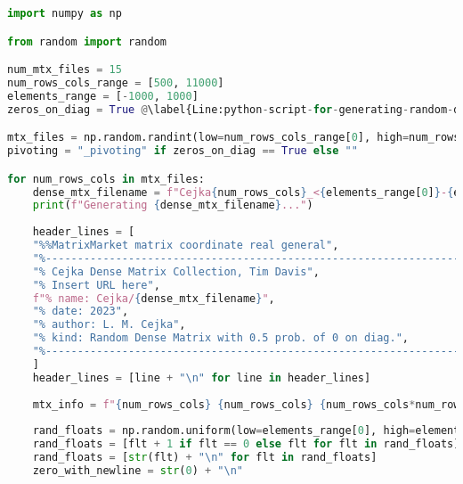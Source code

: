 \begin{lstlisting}[caption={Implementation of the \code{generate-rand-dense-mtxs.py} script used to generate dense matrices in the Matrix Market File Format, as described in Section~\ref{Subsection:implementation->decomposition-project->benchmarks}.
Each element in the matrix is randomly generated within the range of -1000 to 1000.
The \code{zeros\_on\_diag} variable, declared on Line~\ref{Line:python-script-for-generating-random-dense-matrices->script->zeros-on-diag-variable}, serves as a flag indicating whether the dense matrix can have zeros on its main diagonal.
When the variable is set to \code{True}, there is a 50\% chance for each element on the main diagonal to be a zero, as shown on Line~\ref{Line:python-script-for-generating-random-dense-matrices->script->zero-in-element-of-main-diagonal}.},label={Listing:python-script-for-generating-random-dense-matrices->script},language=Python,escapechar=@]
import numpy as np

from random import random

num_mtx_files = 15
num_rows_cols_range = [500, 11000]
elements_range = [-1000, 1000]
zeros_on_diag = True @\label{Line:python-script-for-generating-random-dense-matrices->script->zeros-on-diag-variable}@

mtx_files = np.random.randint(low=num_rows_cols_range[0], high=num_rows_cols_range[1], size=num_mtx_files)
pivoting = "_pivoting" if zeros_on_diag == True else ""

for num_rows_cols in mtx_files:
	dense_mtx_filename = f"Cejka{num_rows_cols}_<{elements_range[0]}-{elements_range[1]}>{pivoting}.mtx"
	print(f"Generating {dense_mtx_filename}...")
	
	header_lines = [
	"%%MatrixMarket matrix coordinate real general",
	"%---------------------------------------------------------------------",
	"% Cejka Dense Matrix Collection, Tim Davis",
	"% Insert URL here",
	f"% name: Cejka/{dense_mtx_filename}",
	"% date: 2023",
	"% author: L. M. Cejka",
	"% kind: Random Dense Matrix with 0.5 prob. of 0 on diag.",
	"%---------------------------------------------------------------------",
	]
	header_lines = [line + "\n" for line in header_lines]
	
	mtx_info = f"{num_rows_cols} {num_rows_cols} {num_rows_cols*num_rows_cols}\n"
	
	rand_floats = np.random.uniform(low=elements_range[0], high=elements_range[1], size=(num_rows_cols*num_rows_cols,))
	rand_floats = [flt + 1 if flt == 0 else flt for flt in rand_floats]
	rand_floats = [str(flt) + "\n" for flt in rand_floats]
	zero_with_newline = str(0) + "\n"
	

\end{lstlisting}

